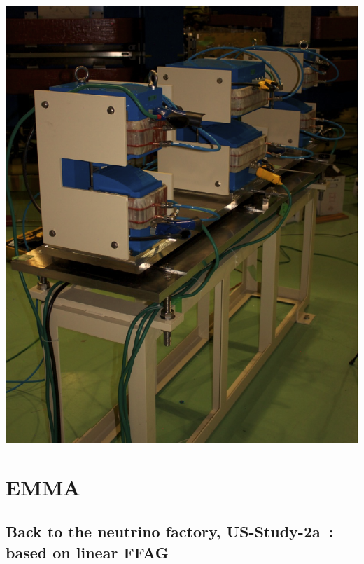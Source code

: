\documentclass[12pt]{article}
\begin{document}
{{\begin{minipage}{.49\linewidth}
\end{minipage}\hspace{4ex}
\begin{minipage}{.49\linewidth}
\centering

\includegraphics[width=.6\linewidth]{./figs_FFAG_introSlides/FFAGBLineJBL_photo.eps}


\end{minipage}\hspace{1mm}
}
}

\clearpage 


\section{\LARGE EMMA }


\subsection*{\LARGE Back to the neutrino factory,  US-Study-2a~: based on linear  FFAG}


\large   
\end{document}
